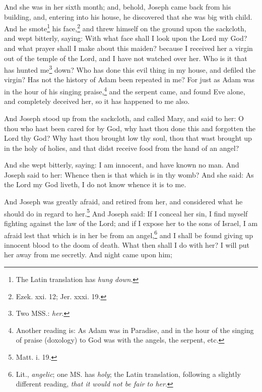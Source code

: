 \pend\pstart
{}

\pend\setcounter{pstartR}{1}\pstart
And she was in her sixth month; and, behold, Joseph came back from his building, and, entering into his house, he discovered that she was big with child. And he smote\footnote{The Latin translation has \textit{hung down}.} his face,\footnote{Ezek. xxi. 12; Jer. xxxi. 19.} and threw himself on the ground upon the sackcloth, and wept bitterly, saying: With what face shall I look upon the Lord my God? and what prayer shall I make about this maiden? because I received her a virgin out of the temple of the Lord, and I have not watched over her. Who is it that has hunted me\footnote{Two MSS.: \textit{her}.} down? Who has done this evil thing in my house, and defiled the virgin? Has not the history of Adam been repeated in me? For just as Adam was in the hour of his singing praise,\footnote{Another reading is: As Adam was in Paradise, and in the hour of the singing of praise (doxology) to God was with the angels, the serpent, etc.} and the serpent came, and found Eve alone, and completely deceived her, so it has happened to me also.

\pend\pstart
And Joseph stood up from the sackcloth, and called Mary, and said to her: O thou who hast been cared for by God, why hast thou done this and forgotten the Lord thy God? Why hast thou brought low thy soul, thou that wast brought up in the holy of holies, and that didst receive food from the hand of an angel?

\pend\pstart
And she wept bitterly, saying: I am innocent, and have known no man. And Joseph said to her: Whence then is that which is in thy womb? And she said: As the Lord my God liveth, I do not know whence it is to me.

\pend\pstart
{}

\pend\setcounter{pstartR}{1}\pstart
And Joseph was greatly afraid, and retired from her, and considered what he should do in regard to her.\footnote{Matt. i. 19.} And Joseph said: If I conceal her sin, I find myself fighting against the law of the Lord; and if I expose her to the sons of Israel, I am afraid lest that which is in her be from an angel,\footnote{Lit., \textit{angelic}; one MS. has \textit{holy}; the Latin translation, following a slightly different reading, \textit{that it would not be fair to her}.} and I shall be found giving up innocent blood to the doom of death. What then shall I do with her? I will put her away from me secretly. And night came upon him;

